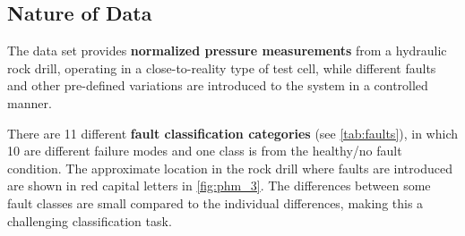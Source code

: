 
\subsection{Nature of Data}


The data set provides \textbf{normalized pressure measurements} from a hydraulic rock drill, operating in a close-to-reality type of test cell, while different faults and other  pre-defined variations are introduced to the system in a controlled manner. 

There are 11 different \textbf{fault classification categories} (see \cref{tab:faults}), in which 10 are different failure modes and one class is from the healthy/no fault condition. 
The approximate location in the rock drill where faults are introduced are shown in red capital letters in \cref{fig:phm_3}. %
The differences between some fault classes are small compared to the individual differences, making this a challenging classification task.


